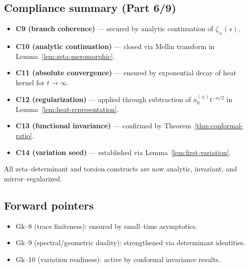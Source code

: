\subsection{Compliance summary (Part 6/9)}
\label{subsec:ch6-part6-compliance} \relax

\begin{remark}
\label{rem:compliance-summary-ch6p6}
\begin{itemize}[leftmargin=*, itemsep=2pt]
  \item \textbf{C9 (branch coherence)} — secured by analytic continuation of $\zeta_\pm(s)$. %
  \item \textbf{C10 (analytic continuation)} — closed via Mellin transform in Lemma~\ref{lem:zeta-meromorphic}. %
  \item \textbf{C11 (absolute convergence)} — ensured by exponential decay of heat kernel for $t\to\infty$. %
  \item \textbf{C12 (regularization)} — applied through subtraction of $a_0^{(\pm)}t^{-n/2}$ in Lemma~\ref{lem:heat-representation}. %
  \item \textbf{C13 (functional invariance)} — confirmed by Theorem~\ref{thm:conformal-ratio}. %
  \item \textbf{C14 (variation seed)} — established via Lemma~\ref{lem:first-variation}. %
\end{itemize}
All zeta–determinant and torsion constructs are now analytic, invariant, and mirror–regularized. %
\end{remark}

\subsection{Forward pointers}
\label{subsec:ch6-part6-forward} \relax

\begin{itemize}[leftmargin=*, itemsep=2pt]
  \item Gk–8 (trace finiteness): ensured by small–time asymptotics. %
  \item Gk–9 (spectral/geometric duality): strengthened via determinant identities. %
  \item Gk–10 (variation readiness): active by conformal invariance results. %
\end{itemize}

